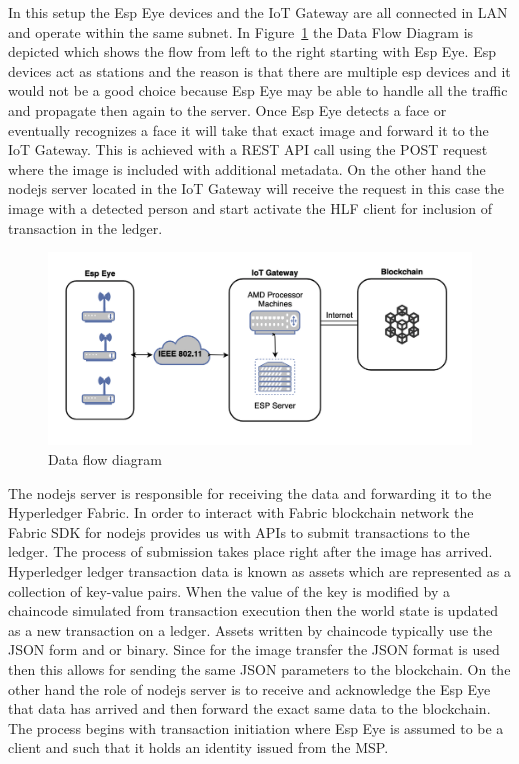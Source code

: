 In this setup the Esp Eye devices and the IoT Gateway are all connected in LAN and operate within the same subnet. In Figure~\ref{fig:dataflow} the Data Flow Diagram is depicted which shows the flow from left to the right starting with Esp Eye. Esp devices act as stations and the reason is that there are multiple esp devices and it would not be a good choice because Esp Eye may be able to handle all the traffic and propagate then again to the server. 
Once Esp Eye detects a face or eventually recognizes a face it will take that exact image and forward it to the IoT Gateway. This is achieved with a REST API call using the POST request where the image is included with additional metadata. On the other hand the nodejs server located in the IoT Gateway will receive the request in this case the image with  a detected person and start activate the HLF client for inclusion of transaction in the ledger.


\begin{figure}[!htb]
    \centering
    \includegraphics[width=1\textwidth]{figures/dataflow.png}
    \caption{Data flow diagram}
    \label{fig:dataflow}
\end{figure}
The nodejs server is responsible for receiving the data and forwarding it to the Hyperledger Fabric. 
In order to interact with Fabric blockchain network the Fabric SDK for nodejs provides us with APIs to submit transactions to the ledger. The process of submission takes place right after the image has arrived. Hyperledger ledger transaction data is known as assets which are represented as a collection of key-value pairs. When the value of the key is modified by a chaincode simulated from transaction execution then the world state is updated as a new transaction on a ledger. Assets written by chaincode typically use the JSON form and or binary. Since for the image transfer the JSON format is used then this allows for sending the same JSON parameters to the blockchain. On the other hand the role of nodejs server is to receive and acknowledge the Esp Eye that data has arrived and then forward the exact same data to the blockchain. The process begins with transaction initiation where Esp Eye is assumed to be a client and such that it holds an identity issued from the MSP. 

